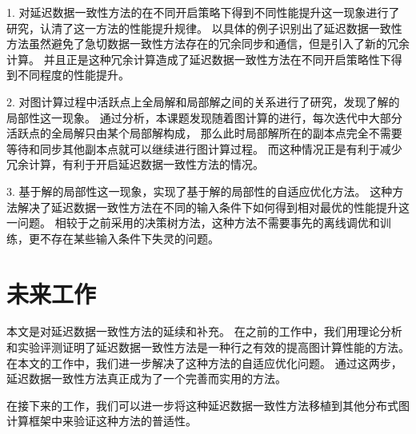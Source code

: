 1. 对延迟数据一致性方法的在不同开启策略下得到不同性能提升这一现象进行了研究，认清了这一方法的性能提升规律。
以具体的例子识别出了延迟数据一致性方法虽然避免了急切数据一致性方法存在的冗余同步和通信，但是引入了新的冗余计算。
并且正是这种冗余计算造成了延迟数据一致性方法在不同开启策略性下得到不同程度的性能提升。

2. 对图计算过程中活跃点上全局解和局部解之间的关系进行了研究，发现了解的局部性这一现象。
通过分析，本课题发现随着图计算的进行，每次迭代中大部分活跃点的全局解只由某个局部解构成，
那么此时局部解所在的副本点完全不需要等待和同步其他副本点就可以继续进行图计算过程。
而这种情况正是有利于减少冗余计算，有利于开启延迟数据一致性方法的情况。

3. 基于解的局部性这一现象，实现了基于解的局部性的自适应优化方法。
这种方法解决了延迟数据一致性方法在不同的输入条件下如何得到相对最优的性能提升这一问题。
相较于之前采用的决策树方法，这种方法不需要事先的离线调优和训练，更不存在某些输入条件下失灵的问题。

\section{未来工作}

本文是对延迟数据一致性方法的延续和补充。
在之前的工作中，我们用理论分析和实验评测证明了延迟数据一致性方法是一种行之有效的提高图计算性能的方法。
在本文的工作中，我们进一步解决了这种方法的自适应优化问题。
通过这两步，延迟数据一致性方法真正成为了一个完善而实用的方法。

在接下来的工作，我们可以进一步将这种延迟数据一致性方法移植到其他分布式图计算框架中来验证这种方法的普适性。


